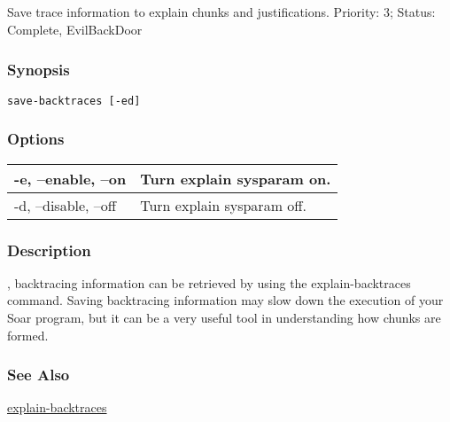 \subsection{}
\label{save-backtraces}
Save trace information to explain chunks and justifications. 
 Priority: 3; Status: Complete, EvilBackDoor
\subsubsection*{Synopsis}
\begin{verbatim}
save-backtraces [-ed]
\end{verbatim}
\subsubsection*{Options}
\begin{tabular}{|l|l|}
\hline 
 -e, --enable, --on  & Turn explain sysparam on.  \\
 \hline 
 -d, --disable, --off  & Turn explain sysparam off.  \\
 \hline 
\end{tabular}
\subsubsection*{Description}
, backtracing information can be retrieved by using the explain-backtraces command. Saving backtracing information may slow down the execution of your Soar program, but it can be a very useful tool in understanding how chunks are formed. 
\subsubsection*{See Also}
\hyperref[explain-backtraces]{explain-backtraces} 